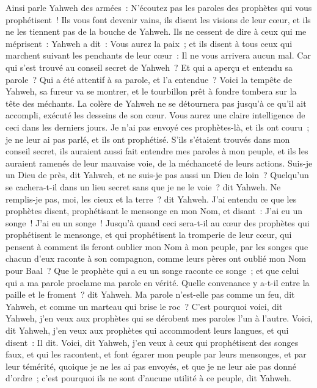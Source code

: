 \begin{multicols}{2}
Ainsi parle Yahweh des armées~: N'écoutez pas les paroles des prophètes qui vous prophétisent~! Ils vous font devenir vains, ils disent les visions de leur cœur, et ils ne les tiennent pas de la bouche de Yahweh.
Ils ne cessent de dire à ceux qui me méprisent~: Yahweh a dit~: Vous aurez la paix~; et ils disent à tous ceux qui marchent suivant les penchants de leur cœur~: Il ne vous arrivera aucun mal.
Car qui s'est trouvé au conseil secret de Yahweh~? Et qui a aperçu et entendu sa parole~? Qui a été attentif à sa parole, et l'a entendue~?
Voici la tempête de Yahweh, sa fureur va se montrer, et le tourbillon prêt à fondre tombera sur la tête des méchants.
La colère de Yahweh ne se détournera pas jusqu'à ce qu'il ait accompli, exécuté les desseins de son cœur. Vous aurez une claire intelligence de ceci dans les derniers jours.
Je n'ai pas envoyé ces prophètes-là, et ils ont couru~; je ne leur ai pas parlé, et ils ont prophétisé.
S'ils s'étaient trouvés dans mon conseil secret, ils auraient aussi fait entendre mes paroles à mon peuple, et ils les auraient ramenés de leur mauvaise voie, de la méchanceté de leurs actions.
Suis-je un Dieu de près, dit Yahweh, et ne suis-je pas aussi un Dieu de loin~?
Quelqu'un se cachera-t-il dans un lieu secret sans que je ne le voie~? dit Yahweh. Ne remplis-je pas, moi, les cieux et la terre~? dit Yahweh.
J'ai entendu ce que les prophètes disent, prophétisant le mensonge en mon Nom, et disant~: J'ai eu un songe~! J'ai eu un songe~!
Jusqu'à quand ceci sera-t-il au cœur des prophètes qui prophétisent le mensonge, et qui prophétisent la tromperie de leur cœur,
qui pensent à comment ils feront oublier mon Nom à mon peuple, par les songes que chacun d'eux raconte à son compagnon, comme leurs pères ont oublié mon Nom pour Baal~?
Que le prophète qui a eu un songe raconte ce songe~; et que celui qui a ma parole proclame ma parole en vérité. Quelle convenance y a-t-il entre la paille et le froment~? dit Yahweh.
Ma parole n'est-elle pas comme un feu, dit Yahweh, et comme un marteau qui brise le roc~?
C'est pourquoi voici, dit Yahweh, j'en veux aux prophètes qui se dérobent mes paroles l'un à l'autre.
Voici, dit Yahweh, j'en veux aux prophètes qui accommodent leurs langues, et qui disent~: Il dit.
Voici, dit Yahweh, j'en veux à ceux qui prophétisent des songes faux, et qui les racontent, et font égarer mon peuple par leurs mensonges, et par leur témérité, quoique je ne les ai pas envoyés, et que je ne leur aie pas donné d'ordre~; c'est pourquoi ils ne sont d'aucune utilité à ce peuple, dit Yahweh.

\end{multicols}

